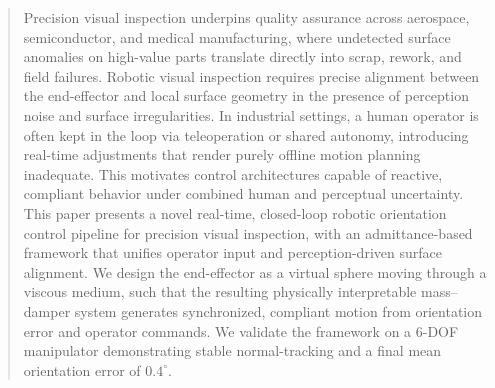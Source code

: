 \documentclass[journal]{IEEEtran}
\begin{document}


% 











\maketitle

\begin{abstract}
Precision visual inspection underpins quality assurance across aerospace, semiconductor, and medical manufacturing, where undetected surface anomalies on high-value parts translate directly into scrap, rework, and field failures. Robotic visual inspection requires precise alignment between the end-effector and local surface geometry in the presence of perception noise and surface irregularities. In industrial settings, a human operator is often kept in the loop via teleoperation or shared autonomy, introducing real-time adjustments that render purely offline motion planning inadequate. This motivates control architectures capable of reactive, compliant behavior under combined human and perceptual uncertainty. This paper presents a novel real-time, closed-loop robotic orientation control pipeline for precision visual inspection, with an admittance-based framework that unifies operator input and perception-driven surface alignment. We design the end-effector as a virtual sphere moving through a viscous medium, such that the resulting physically interpretable mass--damper system generates synchronized, compliant motion from orientation error and operator commands. We validate the framework on a 6-DOF manipulator demonstrating stable normal-tracking and a final mean orientation error of $0.4^\circ$.

\end{abstract}
\end{document}
